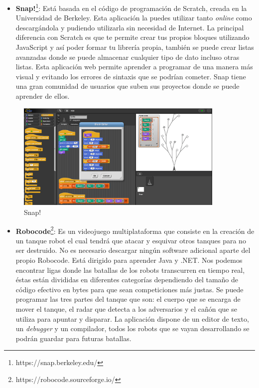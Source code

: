 \begin{itemize}
\item \textbf{Snap!}\footnote{https://snap.berkeley.edu/}: Está basada en el código de programación de Scratch, creada en la Universidad de Berkeley. Esta aplicación la puedes utilizar tanto \textit{online} como descargándola y pudiendo utilizarla sin necesidad de Internet. La principal diferencia con Scratch es que te permite crear tus propios bloques utilizando JavaScript y así poder formar tu librería propia, también se puede crear listas avanzadas donde se puede almacenar cualquier tipo de dato incluso otras listas.  Esta aplicación web permite aprender a programar de una manera más visual y evitando los errores de sintaxis que se podrían cometer. Snap tiene una gran comunidad de usuarios que suben sus proyectos donde se puede aprender de ellos\cite{app}.
\end{itemize}

\begin{figure}[H]
    \centering
    \includegraphics[width=10cm, keepaspectratio]{img/snap.png}
    \caption{Snap!}
    \label{fig:snap}
\end{figure}

\begin{itemize}
\item \textbf{Robocode}\footnote{https://robocode.sourceforge.io/}: Es un videojuego multiplataforma que consiste en la creación de un tanque robot el cual tendrá que atacar y esquivar otros tanques para no ser destruido. No es necesario descargar ningún software adicional aparte del propio Robocode. Está dirigido para aprender Java y .NET. Nos podemos encontrar ligas donde las batallas de los robots transcurren en tiempo real, éstas están divididas en diferentes categorías dependiendo del tamaño de código efectivo en bytes para que sean competiciones más justas. Se puede programar las tres partes del tanque que son: el cuerpo que se encarga de mover el tanque, el radar que detecta a los adversarios y el cañón que se utiliza para apuntar y disparar. La aplicación dispone de un editor de texto, un \textit{debugger} y un compilador, todos los robots que se vayan desarrollando se podrán guardar para futuras batallas\cite{app}.
\end{itemize}

